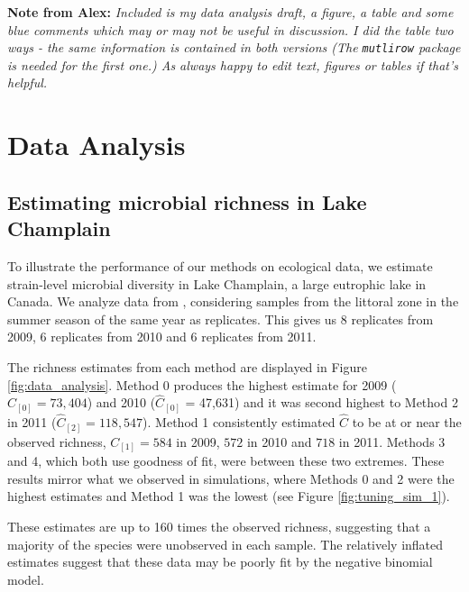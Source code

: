 \documentclass[12pt]{article}
\theoremstyle{break}
\theoremstyle{break}
\begin{document}
%

\def\spacingset#1{\renewcommand{\baselinestretch}%
{#1}\small\normalsize} \spacingset{1}




\noindent \textbf{Note from Alex:}\textit{ Included is my data analysis draft, a figure, a table and some blue comments which may or may not be useful in discussion.  I did the table two ways - the same information is contained in both versions (The \texttt{mutlirow} package is needed for the first one.)  As always happy to edit text, figures or tables if that's helpful.}






\section{Data Analysis}
\label{sec:data_analysis}

\subsection{Estimating microbial richness in Lake Champlain}

To illustrate the performance of our methods on ecological data, we estimate strain-level microbial diversity in Lake Champlain, a large eutrophic lake in Canada.  We analyze data from \citet{tromas_2017}, considering samples from the littoral zone in the summer season of the same year as replicates. This gives us 8 replicates from 2009, 6 replicates from 2010 and 6 replicates from 2011.  

The richness estimates from each method are displayed in Figure \ref{fig:data_analysis}.  Method 0 produces the highest estimate for 2009 ($\widehat{C}_{[0]} = 73,404$) and 2010 ($\widehat{C}_{[0]}$ = 47,631) and it was second highest to Method 2 in 2011 ($\widehat{C}_{[2]} = 118,547$).  Method 1 consistently estimated $\widehat{C}$ to be at or near the observed richness, $C_{[1]} = 584$ in 2009,  $572$ in 2010 and $718$ in 2011.  Methods 3 and 4, which both use goodness of fit, were between these two extremes.  These results mirror what we observed in simulations, where Methods 0 and 2 were the highest estimates and Method 1 was the lowest (see Figure \ref{fig:tuning_sim_1}).

These estimates are up to 160 times the observed richness, suggesting that a majority of the species were unobserved in each sample.  The relatively inflated estimates suggest that these data may be poorly fit by the negative binomial model.  \\
\end{document}
